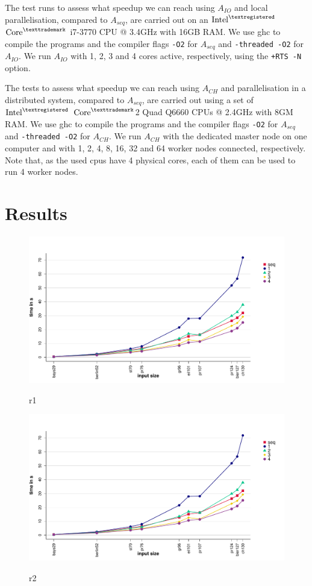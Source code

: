 The test runs to assess what speedup we can reach using $A_{IO}$ and local parallelisation, compared to $A_{seq}$, are carried out on an $\text{Intel}^{\textregistered}$ $\text{Core}^{\texttrademark}$ i7-3770 CPU @ 3.4GHz with 16GB RAM. We use \textsf{ghc} to compile the programs and the compiler flags \texttt{-O2} for $A_{seq}$ and \texttt{-threaded -O2} for $A_{IO}$. We run $A_{IO}$ with 1, 2, 3 and 4 cores active, respectively,  using the \texttt{+RTS -N} option.

The tests to assess what speedup we can reach using $A_{CH}$ and parallelisation in a distributed system, compared to $A_{seq}$, are carried out using a set of $\text{Intel}^{\textregistered}$ $\text{Core}^{\texttrademark}$2 Quad Q6660 CPUs @ 2.4GHz with 8GM RAM. We use \textsf{ghc} to compile the programs and the compiler flags \texttt{-O2} for $A_{seq}$ and \texttt{-threaded -O2} for $A_{CH}$. We run $A_{CH}$ with the dedicated master node on one computer and with 1, 2, 4, 8, 16, 32 and 64 worker nodes connected, respectively. Note that, as the used cpus have 4 physical cores, each of them can be used to run 4 worker nodes.

\section{Results}
\begin{figure}[h!]
  \centering
  \includegraphics[width=\textwidth]{img/test_local_1.pdf}
  \label{fig:test_local_1}
  \caption{r1}
\end{figure}

\begin{figure}[h!]
  \centering
  \includegraphics[width=\textwidth]{img/test_distributed_1.pdf}
  \label{fig:test_distributed_1}
  \caption{r2}
\end{figure}